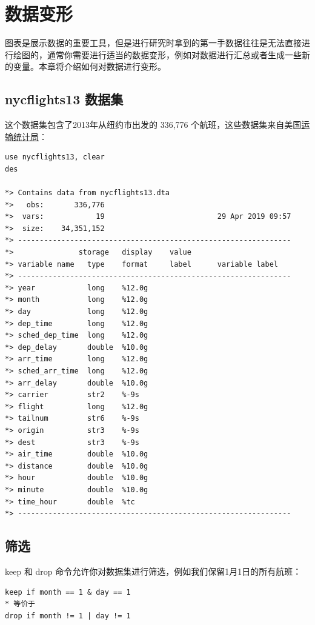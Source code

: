 \chapter{数据变形}

图表是展示数据的重要工具，但是进行研究时拿到的第一手数据往往是无法直接进行绘图的，通常你需要进行适当的数据变形，例如对数据进行汇总或者生成一些新的变量。本章将介绍如何对数据进行变形。

\section{nycflights13 数据集}

这个数据集包含了2013年从纽约市出发的 336,776 个航班，这些数据集来自美国\href{http://www.transtats.bts.gov/DatabaseInfo.asp?DB_ID=120\&Link=0}{运输统计局}：

\begin{lstlisting}
use nycflights13, clear
des

*> Contains data from nycflights13.dta
*>   obs:       336,776
*>  vars:            19                          29 Apr 2019 09:57
*>  size:    34,351,152
*> ---------------------------------------------------------------
*>               storage   display    value
*> variable name   type    format     label      variable label
*> ---------------------------------------------------------------
*> year            long    %12.0g
*> month           long    %12.0g
*> day             long    %12.0g
*> dep_time        long    %12.0g
*> sched_dep_time  long    %12.0g
*> dep_delay       double  %10.0g
*> arr_time        long    %12.0g
*> sched_arr_time  long    %12.0g
*> arr_delay       double  %10.0g
*> carrier         str2    %-9s
*> flight          long    %12.0g
*> tailnum         str6    %-9s
*> origin          str3    %-9s
*> dest            str3    %-9s
*> air_time        double  %10.0g
*> distance        double  %10.0g
*> hour            double  %10.0g
*> minute          double  %10.0g
*> time_hour       double  %tc
*> ---------------------------------------------------------------
\end{lstlisting}

\section{筛选}

keep 和 drop 命令允许你对数据集进行筛选，例如我们保留1月1日的所有航班：

\begin{lstlisting}
keep if month == 1 & day == 1
* 等价于
drop if month != 1 | day != 1
\end{lstlisting}

